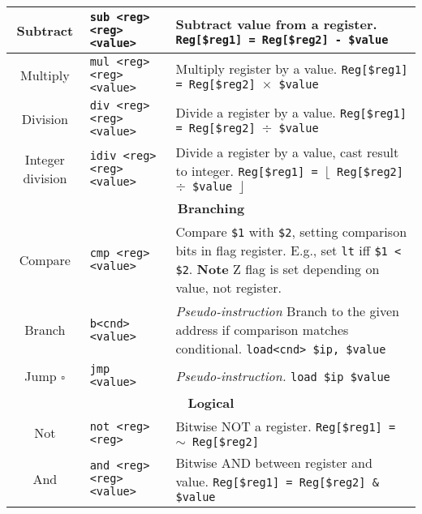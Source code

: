 \documentclass{article}
\begin{document}
\begin{longtable}{|c|l|l|}
    \hline
    Subtract & \texttt{sub <reg> <reg> <value>} & \makecell[l]{Subtract value from a register.\\%
    \texttt{Reg[\$reg1] = Reg[\$reg2] - \$value}} \\
    \hline
    Multiply & \texttt{mul <reg> <reg> <value>} & \makecell[l]{Multiply register by a value.\\%
    \texttt{Reg[\$reg1] = Reg[\$reg2] \(\times\) \$value}} \\
    \hline
    Division & \texttt{div <reg> <reg> <value>} & \makecell[l]{Divide a register by a value.\\%
    \texttt{Reg[\$reg1] = Reg[\$reg2] \(\div\) \$value}} \\
    \hline
    Integer division & \texttt{idiv <reg> <reg> <value>} & \makecell[l]{Divide a register by a value, cast result to integer.\\%
    \texttt{Reg[\$reg1] = \(\lfloor\) Reg[\$reg2] \(\div\) \$value \(\rfloor\)}} \\
    \hline \hline
    \multicolumn{3}{|c|}{\textbf{Branching}} \\
    \hline
    Compare & \texttt{cmp <reg> <value>} & \makecell[l]{Compare \texttt{\$1} with \texttt{\$2}, setting comparison bits in flag register.\\%
    E.g., set \texttt{lt} iff \texttt{\$1 < \$2}.\\%
    \textbf{Note} Z flag is set depending on value, not register.} \\
    \hline
    Branch & \texttt{b<cnd> <value>} & \makecell[l]{\textit{Pseudo-instruction}\\%
    Branch to the given address if comparison matches conditional.\\%
    \texttt{load<cnd> \$ip, \$value}} \\
    \hline
    Jump \(\square\) & \texttt{jmp <value>} & \makecell[l]{\textit{Pseudo-instruction.}\\%
    \texttt{load \$ip \$value}} \\
    \hline \hline
    \multicolumn{3}{|c|}{\textbf{Logical}} \\
    \hline
    Not & \texttt{not <reg> <reg>} & \makecell[l]{Bitwise NOT a register.\\%
    \texttt{Reg[\$reg1] = \(\sim\) Reg[\$reg2]}} \\
    \hline
    And & \texttt{and <reg> <reg> <value>} & \makecell[l]{Bitwise AND between register and value.\\%
    \texttt{Reg[\$reg1] = Reg[\$reg2] \& \$value}} \\

\end{longtable}
\end{document}
